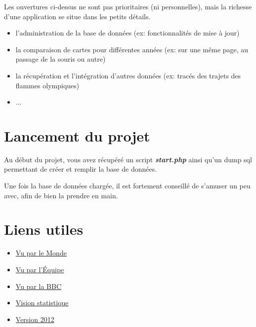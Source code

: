 \documentclass{article}
\begin{document}
Les ouvertures ci-dessus ne sont pas prioritaires (ni personnelles), mais la richesse d'une application se situe dans les petits détails.

\begin{itemize}

\item l'administration de la base de données (ex: fonctionnalités de mise à jour)

\item la comparaison de cartes pour différentes années (ex: sur une même page, au passage de la souris ou autre)

\item la récupération et l'intégration d'autres données (ex: tracés des trajets des flammes olympiques)

\item ...

\end{itemize}

\section{Lancement du projet}

Au début du projet, vous avez récupéré un script \textbf{\textit{start.php}} ainsi qu'un dump sql permettant de créer et remplir la base de données.

Une fois la base de données chargée, il est fortement conseillé de s'amuser un peu avec, afin de bien la prendre en main.

\section{Liens utiles}

\begin{itemize}

\item
\href{https://www.lemonde.fr/les-decodeurs/article/2018/02/26/jo-2018-et-si-on-revoyait-le-classement_5262807_4355770.html}{Vu par le Monde}

\item
\href{http://www.wedodata.fr/equipe-jo2016.php}{Vu par l'Équipe}

\item
\href{https://www.bbc.com/sport/olympics/37148372}{Vu par la BBC}

\item
\href{https://www.statista.com/topics/1730/olympic-summer-games/}{Vision statistique}

\item
\href{https://www.theguardian.com/commentisfree/2012/aug/03/london-2012-olympics-open-data}{Version 2012}

\end{itemize}
\end{document}
